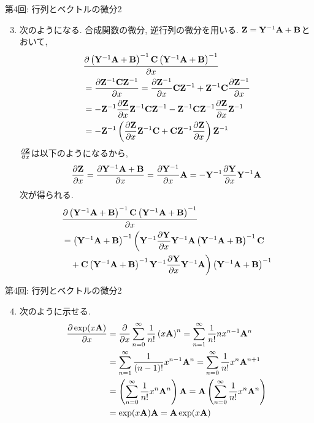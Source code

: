 \documentclass[dvipdfmx,notheorems,t]{beamer}
\begin{document}
\begin{frame}{第4回: 行列とベクトルの微分2}
\begin{enumerate}
  \setcounter{enumi}{2}
  \item 次のようになる. 合成関数の微分, 逆行列の微分を用いる.
  $\vb{Z} = \vb{Y}^{-1} \vb{A} + \vb{B}$とおいて,
  \begin{align*}
    & \pdv{\left( \vb{Y}^{-1} \vb{A} + \vb{B} \right)^{-1}
      \vb{C} \left( \vb{Y}^{-1} \vb{A} + \vb{B} \right)^{-1}}{x} \\
      &= \pdv{\vb{Z}^{-1} \vb{C} \vb{Z}^{-1}}{x}
      = \pdv{\vb{Z}^{-1}}{x} \vb{C} \vb{Z}^{-1} + \vb{Z}^{-1} \vb{C} \pdv{\vb{Z}^{-1}}{x} \\
      &= -\vb{Z}^{-1} \pdv{\vb{Z}}{x} \vb{Z}^{-1} \vb{C} \vb{Z}^{-1}
        - \vb{Z}^{-1} \vb{C} \vb{Z}^{-1} \pdv{\vb{Z}}{x} \vb{Z}^{-1} \\
      &= -\vb{Z}^{-1} \left( \pdv{\vb{Z}}{x} \vb{Z}^{-1} \vb{C} + \vb{C} \vb{Z}^{-1} \pdv{\vb{Z}}{x} \right) \vb{Z}^{-1}
  \end{align*}
  $\pdv{\vb{Z}}{x}$は以下のようになるから,
  \begin{align*}
    \pdv{\vb{Z}}{x} = \pdv{\vb{Y}^{-1} \vb{A} + \vb{B}}{x}
      = \pdv{\vb{Y}^{-1}}{x} \vb{A}
      = -\vb{Y}^{-1} \pdv{\vb{Y}}{x} \vb{Y}^{-1} \vb{A}
  \end{align*}
  次が得られる.
  \begin{align*}
    & \pdv{\left( \vb{Y}^{-1} \vb{A} + \vb{B} \right)^{-1}
      \vb{C} \left( \vb{Y}^{-1} \vb{A} + \vb{B} \right)^{-1}}{x} \\
    &= \left( \vb{Y}^{-1} \vb{A} + \vb{B} \right)^{-1}
      \bigg( \vb{Y}^{-1} \pdv{\vb{Y}}{x} \vb{Y}^{-1} \vb{A}
      \left( \vb{Y}^{-1} \vb{A} + \vb{B} \right)^{-1} \vb{C} \\
      & \quad + \vb{C} \left( \vb{Y}^{-1} \vb{A} + \vb{B} \right)^{-1}
      \vb{Y}^{-1} \pdv{\vb{Y}}{x} \vb{Y}^{-1} \vb{A} \bigg)
      \left( \vb{Y}^{-1} \vb{A} + \vb{B} \right)^{-1}
  \end{align*}
\end{enumerate}
\end{frame}

\begin{frame}{第4回: 行列とベクトルの微分2}
\begin{enumerate}
  \setcounter{enumi}{3}
  \item 次のように示せる.
  \begin{align*}
    \pdv{\exp(x \vb{A})}{x} &= \pdv{x} \sum_{n = 0}^\infty \frac{1}{n!} \left( x \vb{A} \right)^n
      = \sum_{n = 1}^\infty \frac{1}{n!} n x^{n - 1} \vb{A}^n \\
      &= \sum_{n = 1}^\infty \frac{1}{(n - 1)!} x^{n - 1} \vb{A}^n
      = \sum_{n = 0}^\infty \frac{1}{n!} x^n \vb{A}^{n + 1} \\
      &= \left( \sum_{n = 0}^\infty \frac{1}{n!} x^n \vb{A}^n \right) \vb{A}
      = \vb{A} \left( \sum_{n = 0}^\infty \frac{1}{n!} x^n \vb{A}^n \right) \\
      &= \exp(x \vb{A}) \vb{A} = \vb{A} \exp(x \vb{A})
  \end{align*}
\end{enumerate}
\end{frame}
\end{document}
